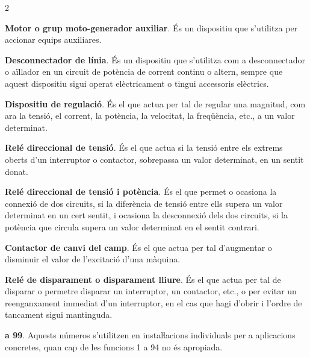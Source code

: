 \begin{multicols}{2}
\begin{list}{}
		\item[\textbf{88}]  
		\textbf{Motor o grup moto-generador auxiliar}. És un dispositiu que s'utilitza per
		accionar equips auxiliares.
		
		\item[\textbf{89}]  
		\textbf{Desconnectador de línia}. És
		un dispositiu que s'utilitza com a desconnectador o aïllador en un
		circuit de potència de corrent continu o altern, sempre que aquest
		dispositiu sigui operat elèctricament o tingui accessoris elèctrics.
		
		\item[\textbf{90}]   
		\textbf{Dispositiu de regulació}. És el que
		actua per tal de regular una magnitud, com ara la tensió, el corrent, la potència,
		la velocitat, la freqüència, etc., a un valor determinat.
		
		\item[\textbf{91}]   
		\textbf{Relé direccional de tensió}.
		És el que actua si la tensió entre els extrems oberts d'un
		interruptor o contactor, sobrepassa un valor determinat, en un
		sentit donat.
		
		\item[\textbf{92}]   
		\textbf{Relé direccional de tensió i potència}. És el que permet o ocasiona la connexió de
		dos circuits, si la diferència de tensió entre ells supera un
		valor determinat en un cert sentit, i ocasiona la desconnexió dels
		dos circuits, si la potència que circula supera un valor determinat
		en el sentit contrari.
		
		\item[\textbf{93}]   
		\textbf{Contactor de canvi del camp}. És el
		que actua per tal d'augmentar o disminuir el valor de l'excitació
		d'una màquina.
		
		\item[\textbf{94}]   
		\textbf{Relé de disparament o disparament lliure}. És el que actua per tal de disparar o permetre disparar un
		interruptor, un contactor, etc., o per evitar un reenganxament
		immediat d'un interruptor, en el cas que hagi d'obrir i l'ordre de
		tancament sigui mantinguda.
		
		\item[\textbf{95}] \textbf{a 99}. Aquests números s'utilitzen en instaŀlacions
		individuals per a aplicacions concretes, quan cap de les funcions 1
		a 94 no és apropiada.
		
	\end{list}
\end{multicols}


